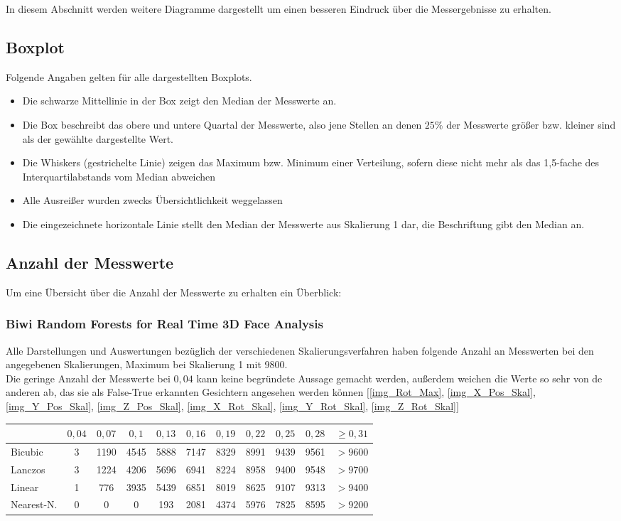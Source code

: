 \label{Abbildungen}
In diesem Abschnitt werden weitere Diagramme dargestellt um einen besseren Eindruck über die Messergebnisse zu erhalten.
\subsection{Boxplot}
Folgende Angaben gelten für alle dargestellten Boxplots.
\begin{itemize}
	\item Die schwarze Mittellinie in der Box zeigt den Median der Messwerte an.
	\item Die Box beschreibt das obere und untere Quartal der Messwerte, also jene Stellen an denen $25\%$ der Messwerte größer bzw. kleiner sind als der gewählte dargestellte Wert.
	\item \glqq Die Whiskers (gestrichelte Linie) zeigen das Maximum bzw. Minimum einer Verteilung, sofern diese nicht mehr als das 1,5-fache des Interquartilabstands vom Median abweichen\grqq 
	\cite{wiki_Boxplot}
	\item Alle Ausreißer wurden zwecks Übersichtlichkeit weggelassen
	\item Die eingezeichnete horizontale Linie stellt den Median der Messwerte aus Skalierung 1 dar, die Beschriftung gibt den Median an.
\end{itemize}
\subsection{Anzahl der Messwerte}
Um eine Übersicht über die Anzahl der Messwerte zu erhalten ein Überblick:
\subsubsection{Biwi Random Forests for Real Time 3D Face Analysis \cite{database_Face_Ori}}
Alle Darstellungen und Auswertungen bezüglich der verschiedenen Skalierungsverfahren haben folgende Anzahl an Messwerten bei den angegebenen Skalierungen, Maximum bei Skalierung 1 mit 9800.\\
Die geringe Anzahl der Messwerte bei $0,04$ kann keine begründete Aussage gemacht werden, außerdem weichen die Werte so sehr von de anderen ab, das sie als False-True erkannten Gesichtern angesehen werden können
$[$\autoref{img_Rot_Max}, \autoref{img_X_Pos_Skal}, \autoref{img_Y_Pos_Skal}, \autoref{img_Z_Pos_Skal}, \autoref{img_X_Rot_Skal}, \autoref{img_Y_Rot_Skal}, \autoref{img_Z_Rot_Skal}$]$\\
\begin{tabular}{|l|c|c|c|c|c|c|c|c|c|c|}
	\hline 
	&$0,04$&$0,07$&$0,1$&$0,13$&$0,16$&$0,19$&$0,22$&$0,25$&$0,28$&$\geq0,31$\\
	\hline 
	Bicubic&3&1190&4545&5888&7147&8329&8991&9439&9561&$>9600$\\
	\hline 
	Lanczos&3&1224&4206&5696&6941&8224&8958&9400&9548&$>9700$\\
	\hline 
	Linear&1&776&3935&5439&6851&8019&8625&9107&9313&$>9400$\\
	\hline 
	Nearest-N.&0&0&0&193&2081&4374&5976&7825&8595&$>9200$\\ 
	\hline 
\end{tabular} 
